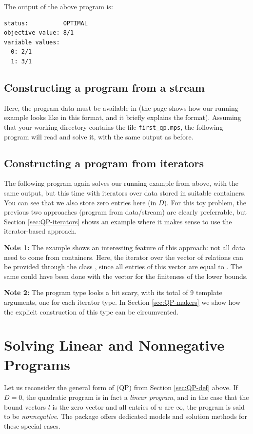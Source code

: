 The output of the above program is:
\begin{verbatim}
status:          OPTIMAL
objective value: 8/1
variable values:
  0: 2/1
  1: 3/1
\end{verbatim}

\subsection{Constructing a program from a stream}
Here, the program data must be available in  (the
 page shows how our running example looks like in
this format, and it briefly explains the format). Assuming that
your working directory contains the file \texttt{first\_qp.mps},
the following program will read and solve it, with the same output
as before.


\subsection{Constructing a program from iterators}
The following program again solves our running example from above,
with the same output, but this time with iterators over data stored 
in suitable containers. You can see that we also store zero 
entries here (in $D$). For this toy problem, the previous two
approaches (program from data/stream) are clearly preferrable, 
but Section \ref{sec:QP-iterators} shows an
example where it makes sense to use the iterator-based approach.


{\bf Note 1:} The example shows an interesting feature of this approach:
not all data need to come from containers. Here, the iterator over the
vector of relations can be provided through the class
, since all entries of this vector
are equal to . The same could have been done with
the vector  for the finiteness of the lower bounds. 

{\bf Note 2:} The program type looks a bit scary, with its total of
9 template arguments, one for each iterator type. In Section
\ref{sec:QP-makers} we show how the explicit construction of
this type can be circumvented.

\section{Solving Linear and Nonnegative Programs\label{sec:QP-lp}}
Let us reconsider the general form of (QP) from Section \ref{sec:QP-def} 
above. If $D=0$, the quadratic program is in fact a \emph{linear program},
and in the case that the bound vectors $l$ is the zero vector and all 
entries of $u$ are $\infty$, the program is said to be \emph{nonnegative}. 
The package offers dedicated models and solution methods for these special
cases.

